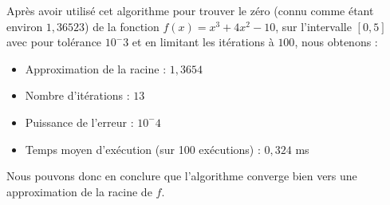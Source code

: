 \documentclass[12pt]{article}
\begin{document}
\noindent Après avoir utilisé cet algorithme pour trouver le zéro (connu comme étant environ $1,36523$) de la fonction $f(x) = x^3 + 4x^2 -10$, sur l'intervalle $[0,5]$ avec pour tolérance $10^-3$ et en limitant les itérations à $100$, nous obtenons :
\begin{itemize}
    \item Approximation de la racine : $1,3654$
    \item Nombre d'itérations : $13$
    \item Puissance de l'erreur : $10^-4$
    \item Temps moyen d'exécution (sur 100 exécutions) : $0,324$ ms
\end{itemize}
Nous pouvons donc en conclure que l'algorithme converge bien vers une approximation de la racine de $f$.

\end{document}
